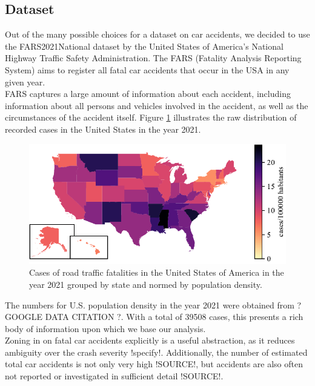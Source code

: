 \documentclass{article}
\theoremstyle{plain}
\theoremstyle{definition}
\theoremstyle{remark}
\begin{document}
\subsection{Dataset}
Out of the many possible choices for a dataset on car accidents, we decided to use the FARS2021National dataset by the United States of America's National Highway Traffic Safety Administration. The FARS (Fatality Analysis Reporting System) aims to register all fatal car accidents that occur in the USA in any given year.
\\
FARS captures a large amount of information about each accident, including information about all persons and vehicles involved in the accident, as well as the circumstances of the accident itself. Figure \ref{fig:cases-fars} illustrates the raw distribution of recorded cases in the United States in the year 2021.
\begin{figure}[ht]
	\vskip 0.2in
	\begin{center}
		\includegraphics[width = \columnwidth]{plots/cases-fars}
		\caption{Cases of road traffic fatalities in the United States of America in the year 2021 grouped by state and normed by population density.}
		\label{fig:cases-fars}
	\end{center}
	\vskip -0.2in
\end{figure}
The numbers for U.S. population density in the year 2021 were obtained from ? GOOGLE DATA CITATION ?. With a total of 39508 cases, this presents a rich body of information upon which we base our analysis.
\\
Zoning in on fatal car accidents explicitly is a useful abstraction, as it reduces ambiguity over the crash severity !specify!. Additionally, the number of estimated total car accidents is not only very high !SOURCE!, but accidents are also often not reported or investigated in sufficient detail !SOURCE!.
\end{document}
